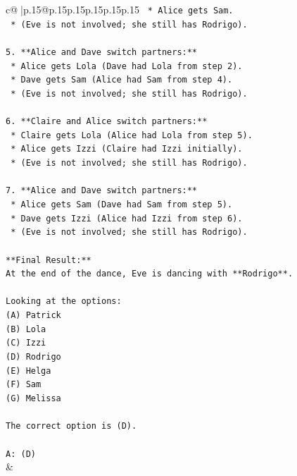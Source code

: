 \documentclass{article}
\begin{document}
{\begin{supertabular}{c@{$\;$}|p{.15\linewidth}@{}p{.15\linewidth}p{.15\linewidth}p{.15\linewidth}p{.15\linewidth}p{.15\linewidth}}
{{{\texttt{    *   Alice gets Sam.} \\
\texttt{    *   (Eve is not involved; she still has Rodrigo).} \\
\\ 
\texttt{5.  **Alice and Dave switch partners:**} \\
\texttt{    *   Alice gets Lola (Dave had Lola from step 2).} \\
\texttt{    *   Dave gets Sam (Alice had Sam from step 4).} \\
\texttt{    *   (Eve is not involved; she still has Rodrigo).} \\
\\ 
\texttt{6.  **Claire and Alice switch partners:**} \\
\texttt{    *   Claire gets Lola (Alice had Lola from step 5).} \\
\texttt{    *   Alice gets Izzi (Claire had Izzi initially).} \\
\texttt{    *   (Eve is not involved; she still has Rodrigo).} \\
\\ 
\texttt{7.  **Alice and Dave switch partners:**} \\
\texttt{    *   Alice gets Sam (Dave had Sam from step 5).} \\
\texttt{    *   Dave gets Izzi (Alice had Izzi from step 6).} \\
\texttt{    *   (Eve is not involved; she still has Rodrigo).} \\
\\ 
\texttt{**Final Result:**} \\
\texttt{At the end of the dance, Eve is dancing with **Rodrigo**.} \\
\\ 
\texttt{Looking at the options:} \\
\texttt{(A) Patrick} \\
\texttt{(B) Lola} \\
\texttt{(C) Izzi} \\
\texttt{(D) Rodrigo} \\
\texttt{(E) Helga} \\
\texttt{(F) Sam} \\
\texttt{(G) Melissa} \\
\\ 
\texttt{The correct option is (D).} \\
\\ 
\texttt{A: (D)} \\
            }
        }
    }
    & \\ \\


\end{supertabular}}
\end{document}
